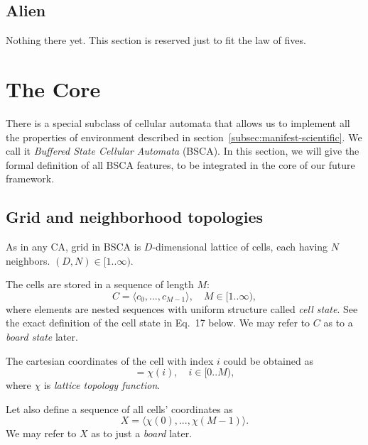 \documentclass[a4paper,12pt,tikz,UTF8]{article}
\begin{document}
  \subsection{Alien}

  Nothing there yet. This section is reserved just to fit the law of fives.

  \newpage

  \section{The Core}
  \label{sec:the-core}

  There is a special subclass of cellular automata that allows us to implement all the properties of environment described in section~\ref{subsec:manifest-scientific}. We call it \textit{Buffered State Cellular Automata} (BSCA). In this section, we will give the formal definition of all BSCA features, to be integrated in the core of our future framework.

  \subsection{Grid and neighborhood topologies}

    As in any CA, grid in BSCA is $D$-dimensional lattice of cells, each having $N$ neighbors. $(D, N) \in [1 .. \infty)$.

    The cells are stored in a sequence of length $M$:
    \begin{equation}
      \label{eq:cells}
      C = \langle c_0, ..., c_{M - 1} \rangle, \quad M \in {[1 .. \infty)},
    \end{equation}
    where elements are nested sequences with uniform structure called \textit{cell state}. See the exact definition of the cell state in Eq.~17 below. We may refer to $C$ as to a \textit{board state} later.

    The cartesian coordinates of the cell with index $i$ could be obtained as 
    \begin{equation}
      [ x_0, ..., x_{D - 1} ] = \chi(i), \quad i \in {[0 .. M)},
    \end{equation}
    where $\chi$ is \textit{lattice topology function}. 

    Let also define a sequence of all cells' coordinates as 
    \begin{equation}
      X = \langle \chi(0), ..., \chi(M - 1) \rangle.
    \end{equation}
    We may refer to $X$ as to just a \textit{board} later.
\end{document}
